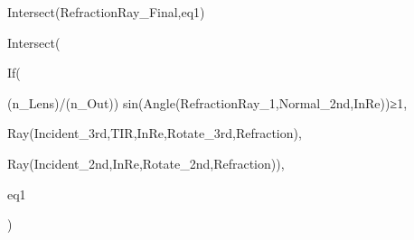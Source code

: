 Intersect(RefractionRay_{Final},eq1)

Intersect(

  If(
    
  (n_{Lens})/(n_{Out})) sin(Angle(RefractionRay_{1},Normal_{2nd,InRe}))≥1,
  
  Ray(Incident_{3rd,TIR,InRe},Rotate_{3rd,Refraction}),
  
  Ray(Incident_{2nd,InRe},Rotate_{2nd,Refraction})),
  
  eq1
  
)